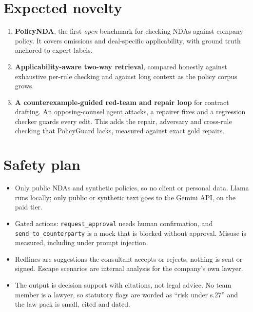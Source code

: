 \documentclass[11pt,a4paper]{article}
\begin{document}
\section{Expected novelty}
\begin{enumerate}
\item \textbf{PolicyNDA}, the first \emph{open} benchmark for checking NDAs against company policy. It covers omissions and deal-specific applicability, with ground truth anchored to expert labels.
\item \textbf{Applicability-aware two-way retrieval}, compared honestly against exhaustive per-rule checking and against long context as the policy corpus grows.
\item \textbf{A counterexample-guided red-team and repair loop} for contract drafting. An opposing-counsel agent attacks, a repairer fixes and a regression checker guards every edit. This adds the repair, adversary and cross-rule checking that PolicyGuard lacks, measured against exact gold repairs.
\end{enumerate}

\section{Safety plan}
\begin{itemize}
\item Only public NDAs and synthetic policies, so no client or personal data. Llama runs locally; only public or synthetic text goes to the Gemini API, on the paid tier.
\item Gated actions: \texttt{request\_approval} needs human confirmation, and \texttt{send\_to\_counterparty} is a mock that is blocked without approval. Misuse is measured, including under prompt injection.
\item Redlines are suggestions the consultant accepts or rejects; nothing is sent or signed. Escape scenarios are internal analysis for the company's own lawyer.
\item The output is decision support with citations, not legal advice. No team member is a lawyer, so statutory flags are worded as ``risk under s.27'' and the law pack is small, cited and dated.
\end{itemize}

\end{document}
